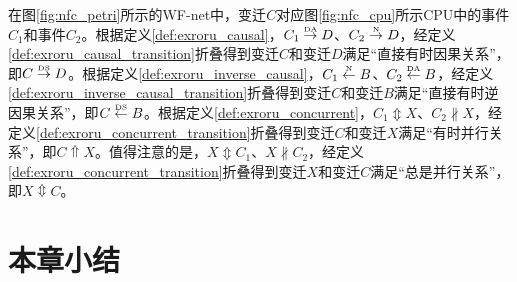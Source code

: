 \begin{example}\label{ex:exroru_transition}
在图\ref{fig:nfc_petri}所示的WF-net中，变迁$C$对应图\ref{fig:nfc_cpu}所示CPU中的事件$C_{1}$和事件$C_{2}$。根据定义\ref{def:exroru_causal}，$C_{1}\overset{\text{\tiny{DA}}}{\rightarrow}D$、$C_{2}\overset{\text{\tiny{N}}}{\rightarrow}D$，经定义\ref{def:exroru_causal_transition}折叠得到变迁$C$和变迁$D$满足“直接有时因果关系”，即$C\overset{\text{\tiny{DS}}}{\rightarrow}D$。根据定义\ref{def:exroru_inverse_causal}，$C_{1}\overset{\text{\tiny{N}}}{\leftarrow}B$、$C_{2}\overset{\text{\tiny{DA}}}{\leftarrow}B$，经定义\ref{def:exroru_inverse_causal_transition}折叠得到变迁$C$和变迁$B$满足“直接有时逆因果关系”，即$C\overset{\text{\tiny{DS}}}{\leftarrow}B$。根据定义\ref{def:exroru_concurrent}，$C_{1}\Updownarrow X$、$C_{2}\nparallel X$，经定义\ref{def:exroru_concurrent_transition}折叠得到变迁$C$和变迁$X$满足“有时并行关系”，即$C\Uparrow X$。值得注意的是，$X\Updownarrow C_{1}$、$X\nparallel C_{2}$，经定义\ref{def:exroru_concurrent_transition}折叠得到变迁$X$和变迁$C$满足“总是并行关系”，即$X\Updownarrow C$。
\end{example}

\section{本章小结}
